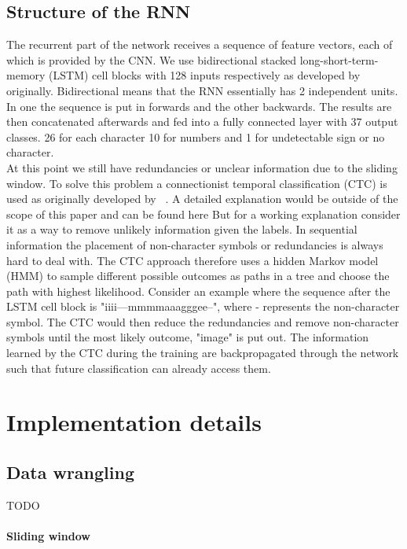 \documentclass{utue} %
\begin{document}
\subsection{Structure of the RNN}
The recurrent part of the network receives a sequence of feature vectors, each of which is provided by the CNN. We use bidirectional stacked long-short-term-memory (LSTM) cell blocks with 128 inputs respectively as developed by ~\cite{Hochreiter:1997:LSM:1246443.1246450} originally. Bidirectional means that the RNN essentially has 2 independent units. In one the sequence is put in forwards and the other backwards. The results are then concatenated afterwards and fed into a fully connected layer with 37 output classes. 26 for each character 10 for numbers and 1 for undetectable sign or no character. \\
At this point we still have redundancies or unclear information due to the sliding window. To solve this problem a connectionist temporal classification (CTC) is used as originally developed by ~\cite{Graves:2006:CTC:1143844.1143891}. A detailed explanation would be outside of the scope of this paper and can be found here %
But for a working explanation consider it as a way to remove unlikely information given the labels. In sequential information the placement of non-character symbols or redundancies is always hard to deal with. The CTC approach therefore uses a hidden Markov model (HMM) to sample different possible outcomes as paths in a tree and choose the path with highest likelihood. Consider an example where the sequence after the LSTM cell block is "iiii---mmmmaaagggee--", where - represents the non-character symbol. The CTC would then reduce the redundancies and remove non-character symbols until the most likely outcome, "image" is put out. The information learned by the CTC during the training are backpropagated through the network such that future classification can already access them. 

\section{Implementation details}
\subsection{Data wrangling}
TODO
\paragraph{Sliding window}
\end{document}
